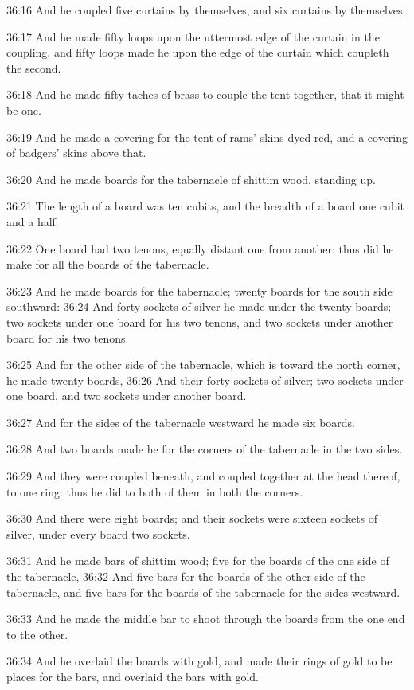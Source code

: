 36:16 And he coupled five curtains by themselves, and six curtains by themselves.

36:17 And he made fifty loops upon the uttermost edge of the curtain in the coupling, and fifty loops made he upon the edge of the curtain which coupleth the second.

36:18 And he made fifty taches of brass to couple the tent together, that it might be one.

36:19 And he made a covering for the tent of rams' skins dyed red, and a covering of badgers' skins above that.

36:20 And he made boards for the tabernacle of shittim wood, standing up.

36:21 The length of a board was ten cubits, and the breadth of a board one cubit and a half.

36:22 One board had two tenons, equally distant one from another: thus did he make for all the boards of the tabernacle.

36:23 And he made boards for the tabernacle; twenty boards for the south side southward: 36:24 And forty sockets of silver he made under the twenty boards; two sockets under one board for his two tenons, and two sockets under another board for his two tenons.

36:25 And for the other side of the tabernacle, which is toward the north corner, he made twenty boards, 36:26 And their forty sockets of silver; two sockets under one board, and two sockets under another board.

36:27 And for the sides of the tabernacle westward he made six boards.

36:28 And two boards made he for the corners of the tabernacle in the two sides.

36:29 And they were coupled beneath, and coupled together at the head thereof, to one ring: thus he did to both of them in both the corners.

36:30 And there were eight boards; and their sockets were sixteen sockets of silver, under every board two sockets.

36:31 And he made bars of shittim wood; five for the boards of the one side of the tabernacle, 36:32 And five bars for the boards of the other side of the tabernacle, and five bars for the boards of the tabernacle for the sides westward.

36:33 And he made the middle bar to shoot through the boards from the one end to the other.

36:34 And he overlaid the boards with gold, and made their rings of gold to be places for the bars, and overlaid the bars with gold.

